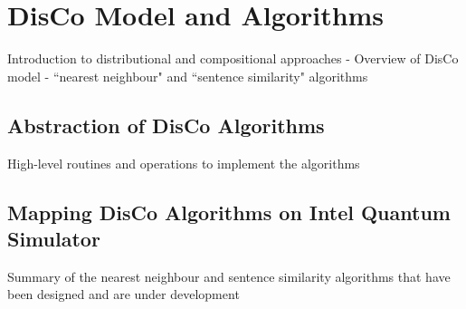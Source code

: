 \section{DisCo Model and Algorithms}
\label{sec:disco_model_and_algorithms}
Introduction to distributional and compositional approaches - Overview of DisCo model - ``nearest neighbour" and ``sentence similarity" algorithms
\cite{DisCoWillBob}

\subsection{Abstraction of DisCo Algorithms}
\label{sec:abstraction_of_disco_algorithms}
High-level routines and operations to implement the algorithms

\subsection{Mapping DisCo Algorithms on Intel Quantum Simulator}
\label{sec:mapping_disco_algorithms_on_intel_quantum_simulator}
Summary of the nearest neighbour and sentence similarity algorithms that have been designed and are under development